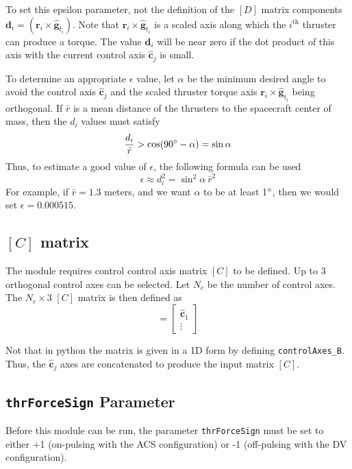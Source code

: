 \documentclass[]{BasiliskReportMemo}
\begin{document}
To set this epsilon parameter, not the definition of the $[D]$ matrix components $\bm d_{i} = (\bm r_{i} \times \hat{\bm g}_{t_{i}})$. Note that $\bm r_{i} \times \hat{\bm g}_{t_{i}}$ is a scaled axis along which the $i^{\text{th}}$ thruster can produce a torque.  The value $\bm d_{i}$ will be near zero if the dot product of this axis with the current control axis $\hat{\bm c}_{j}$ is small.  

To determine an appropriate $\epsilon$ value, let $\alpha$ be the minimum desired angle to avoid the control axis $\hat{\bm c}_{j}$ and the scaled thruster torque axis $\bm r_{i} \times \hat{\bm g}_{t_{i}}$ being orthogonal.  If $\bar r$ is a mean distance of the thrusters to the spacecraft center of mass, then the $d_{i}$ values must satisfy
\begin{equation}
	\frac{d_{i}}{\bar r} > \cos(90\dg - \alpha) = \sin\alpha
\end{equation}
Thus, to estimate a good value of $\epsilon$, the following formula can be used
\begin{equation}
	\epsilon \approx d_{i}^{2} = \sin^{2}\!\alpha \ \bar{r}^{2}
\end{equation}
For example, if $\bar{r} = 1.3$ meters, and we want $\alpha$ to be at least 1$\dg$, then we would set $\epsilon = 0.000515$.

\subsection{$[C]$ matrix}
The module requires control control axis matrix $[C]$ to be defined.  Up to 3 orthogonal control axes can be selected.  Let $N_{c}$ be the number of control axes.  The $N_{c}\times 3$ $[C]$ matrix is then defined as
\begin{equation}
	[C] = \begin{bmatrix}
		\hat{\bm c}_{1}
		\\
		\vdots
	\end{bmatrix}
\end{equation}

Not that in python the matrix is given in a 1D form by defining {\tt controlAxes\_B}.  Thus, the $\hat{\bm c}_{j}$ axes are concatenated to produce the input matrix $[C]$. 

\subsection{{\tt thrForceSign} Parameter}
Before this module can be run, the parameter {\tt thrForceSign} must be set to either +1 (on-pulsing with the ACS configuration) or -1 (off-pulsing with the DV configuration).
\end{document}
